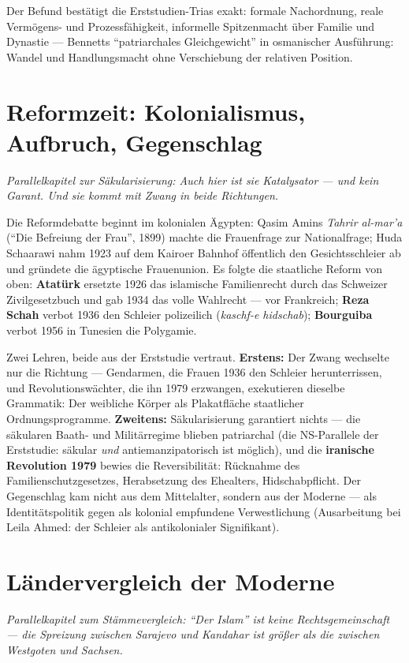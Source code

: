 \documentclass[11pt,a4paper,ngerman]{scrartcl}
\newcommand{\chipbase}[2]{\hspace{0pt}{\footnotesize\textcolor{#1}{[\textsc{#2}]}}}
\newcommand{\chipbelegt}[1]{\chipbase{chipgreen}{#1}}
\newcommand{\chipplausibel}[1]{\chipbase{chipamber}{#1}}
\begin{document}
Der Befund bestätigt die Erststudien-Trias exakt: formale Nachordnung, reale Vermögens- und Prozessfähigkeit, informelle Spitzenmacht über Familie und Dynastie --- Bennetts \enquote{patriarchales Gleichgewicht} in osmanischer Ausführung: Wandel und Handlungsmacht ohne Verschiebung der relativen Position. \chipplausibel{plausibel}

\section{Reformzeit: Kolonialismus, Aufbruch, Gegenschlag}
\noindent\textit{Parallelkapitel zur Säkularisierung: Auch hier ist sie Katalysator --- und kein Garant. Und sie kommt mit Zwang in beide Richtungen.}
\medskip

Die Reformdebatte beginnt im kolonialen Ägypten: Qasim Amins \emph{Tahrir al-mar'a} (\enquote{Die Befreiung der Frau}, 1899) machte die Frauenfrage zur Nationalfrage; Huda Schaarawi nahm 1923 auf dem Kairoer Bahnhof öffentlich den Gesichtsschleier ab und gründete die ägyptische Frauenunion. Es folgte die staatliche Reform von oben: \textbf{Atatürk} ersetzte 1926 das islamische Familienrecht durch das Schweizer Zivilgesetzbuch und gab 1934 das volle Wahlrecht --- vor Frankreich; \textbf{Reza Schah} verbot 1936 den Schleier polizeilich (\emph{kaschf-e hidschab}); \textbf{Bourguiba} verbot 1956 in Tunesien die Polygamie. \chipbelegt{belegt}

Zwei Lehren, beide aus der Erststudie vertraut. \textbf{Erstens:} Der Zwang wechselte nur die Richtung --- Gendarmen, die Frauen 1936 den Schleier herunterrissen, und Revolutionswächter, die ihn 1979 erzwangen, exekutieren dieselbe Grammatik: Der weibliche Körper als Plakatfläche staatlicher Ordnungsprogramme. \chipplausibel{plausibel} \textbf{Zweitens:} Säkularisierung garantiert nichts --- die säkularen Baath- und Militärregime blieben patriarchal (die NS-Parallele der Erststudie: säkular \emph{und} antiemanzipatorisch ist möglich), und die \textbf{iranische Revolution 1979} bewies die Reversibilität: Rücknahme des Familienschutzgesetzes, Herabsetzung des Ehealters, Hidschabpflicht. Der Gegenschlag kam nicht aus dem Mittelalter, sondern aus der Moderne --- als Identitätspolitik gegen als kolonial empfundene Verwestlichung (Ausarbeitung bei Leila Ahmed: der Schleier als antikolonialer Signifikant). \chipbelegt{belegt}
\section{Ländervergleich der Moderne}
\noindent\textit{Parallelkapitel zum Stämmevergleich: \enquote{Der Islam} ist keine Rechtsgemeinschaft --- die Spreizung zwischen Sarajevo und Kandahar ist größer als die zwischen Westgoten und Sachsen.}
\medskip
\end{document}

